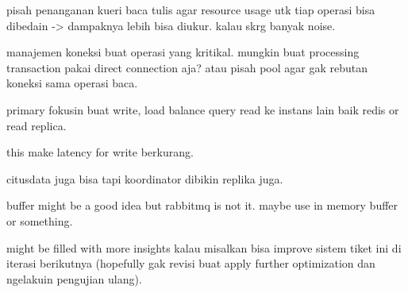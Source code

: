 pisah penanganan kueri baca tulis agar resource usage utk tiap operasi bisa dibedain -> dampaknya lebih bisa diukur. kalau skrg banyak noise.

manajemen koneksi buat operasi yang kritikal. mungkin buat processing transaction pakai direct connection aja? atau pisah pool agar gak rebutan koneksi sama operasi baca.

primary fokusin buat write, load balance query read ke instans lain baik redis or read replica.

this make latency for write berkurang.

citusdata juga bisa tapi koordinator dibikin replika juga.

buffer might be a good idea but rabbitmq is not it. maybe use in memory buffer or something.

might be filled with more insights kalau misalkan bisa improve sistem tiket ini di iterasi berikutnya (hopefully gak revisi buat apply further optimization dan ngelakuin pengujian ulang).
